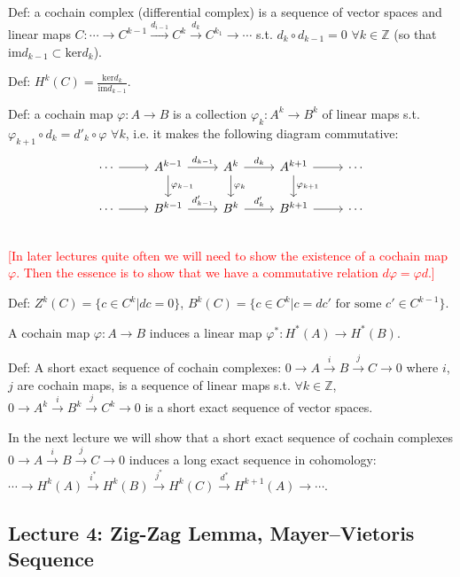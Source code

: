 \documentclass{article}
\theoremstyle{mystyle}
\theoremstyle{remark}
\numberwithin{equation}{section}
\begin{document}
Def: a cochain complex (differential complex) is a sequence of vector spaces and linear maps $C\colon \cdots \rightarrow C^{k-1}\xrightarrow{d_{i-1}} C^k\xrightarrow{d_k} C^{k_1}\rightarrow \cdots$ s.t. $d_k\circ d_{k-1} = 0$ $\forall k \in \mathbb{Z}$ (so that $\mathrm{im}d_{k-1}\subset \mathrm{ker} d_k$).

Def: $H^k(C) = \frac{\mathrm{ker}d_k}{\mathrm{im}d_{k-1}}$. 

Def: a cochain map $\varphi\colon A\rightarrow B$ is a collection $\varphi_k\colon A^k\rightarrow B^k$ of linear maps s.t. $\varphi_{k+1}\circ d_k  = d'_k\circ \varphi$ $\forall k$, i.e. it makes the following diagram commutative:
$$
\begin{tikzcd}
\cdots \ar[r] & A^{k-1} \ar[r,"d_{k-1}"] \ar[d,"\varphi_{k-1}"] & A^k \ar[r,"d_k"]\ar[d,"\varphi_k"] & A^{k+1} \ar[r]\ar[d,"\varphi_{k+1}"] & \cdots \\
\cdots \ar[r] & B^{k-1} \ar[r,"d'_{k-1}"]  & B^k \ar[r,"d'_k"]& B^{k+1} \ar[r] & \cdots \\
\end{tikzcd}
$$
\textcolor{red}{[In later lectures quite often we will need to show the existence of a cochain map $\varphi$. Then the essence is to show that we have a commutative relation $d \varphi = \varphi d$.]}

Def: $Z^k(C) = \{c\in C^k|dc = 0\}$, $B^k(C) = \{c\in C^k| c=dc' \text{ for some }c' \in C^{k-1}\}$.


A cochain map $\varphi\colon A\rightarrow B$ induces a linear map $\varphi^*\colon H^*(A)\rightarrow H^*(B)$. 

Def: A short exact sequence of cochain complexes: $0\rightarrow A\xrightarrow{i} B\xrightarrow{j} C\rightarrow 0$ where $i$, $j$ are cochain maps, is a sequence of linear maps s.t. $\forall k\in \mathbb{Z}$,
$0\rightarrow A^k\xrightarrow{i}B^k\xrightarrow{j} C^k\rightarrow 0$ is a short exact sequence of vector spaces. 

In the next lecture we will show that a short exact sequence of cochain complexes $0\rightarrow A\xrightarrow{i} B\xrightarrow{j} C\rightarrow 0$ induces 
a long exact sequence in cohomology: $\cdots \rightarrow H^k(A)\xrightarrow{i^*}H^k(B)\xrightarrow{j^*}H^k(C)\xrightarrow{d^*}
H^{k+1}(A)\rightarrow \cdots$.






\subsection{Lecture 4: Zig-Zag Lemma, Mayer--Vietoris Sequence}
\end{document}
